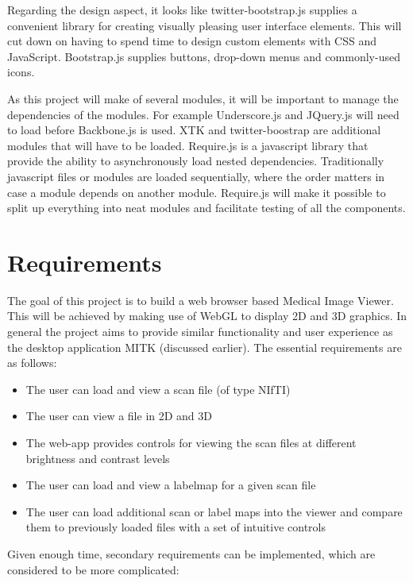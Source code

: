 \documentclass[a4paper,11pt,titlepage]{article}
\begin{document}
Regarding the design aspect, it looks like twitter-bootstrap.js supplies a convenient library for creating visually pleasing user interface elements. This will cut down on having to spend time to design custom elements with CSS and JavaScript. Bootstrap.js supplies buttons, drop-down menus and commonly-used icons.

As this project will make of several modules, it will be important to manage the dependencies of the modules. For example Underscore.js and JQuery.js will need to load before Backbone.js is used. XTK and twitter-boostrap are additional modules that will have to be loaded. Require.js is a javascript library that provide the ability to asynchronously load nested dependencies. Traditionally javascript files or modules are loaded sequentially, where the order matters in case a module depends on another module. Require.js will make it possible to split up everything into neat modules and facilitate testing of all the components.




\section{Requirements}

The goal of this project is to build a web browser based Medical Image Viewer. This will be achieved by making use of WebGL to display 2D and 3D graphics. In general the project aims to provide similar functionality and user experience as the desktop application MITK (discussed earlier). The essential requirements are as follows:

\begin{itemize}
\item The user can load and view a scan file (of type NIfTI)
\item The user can view a file in 2D and 3D
\item The web-app provides controls for viewing the scan files at different brightness and contrast levels
\item The user can load and view a labelmap for a given scan file
\item The user can load additional scan or label maps into the viewer and compare them to previously loaded files with a set of intuitive controls
\end{itemize}

Given enough time, secondary requirements can be implemented, which are considered to be more complicated:
\end{document}
